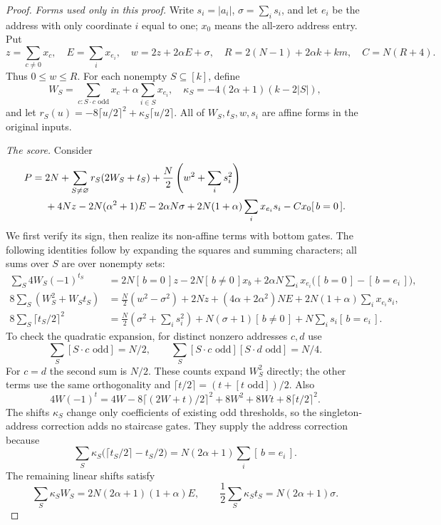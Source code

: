 \documentclass[11pt]{article}
\newcommand{\ind}[1]{[\,#1\,]}
\begin{document}
\begin{proof}
\emph{Forms used only in this proof.}
Write $s_i=|a_i|$, $\sigma=\sum_i s_i$, and let $e_i$ be the address with
only coordinate $i$ equal to one; $x_0$ means the all-zero address entry. Put
$$
z=\sum_{c\ne0}x_c,\quad E=\sum_i x_{e_i},\quad
w=2z+2\alpha E+\sigma,\quad R=2(N-1)+2\alpha k+km,\quad C=N(R+4).
$$
Thus $0\le w\le R$. For each nonempty $S\subseteq[k]$, define
$$
W_S=\sum_{c:S\cdot c\text{ odd}}x_c+\alpha\sum_{i\in S}x_{e_i},\quad
\kappa_S=-4(2\alpha+1)(k-2|S|),
$$
and let $r_S(u)=-8\lceil u/2\rceil^2+\kappa_S\lceil u/2\rceil$.
All of $W_S,t_S,w,s_i$ are affine forms in the original inputs.

\emph{The score.} Consider
\begin{align}\label{eq:bestscore}
P={}&2N+\sum_{S\ne\varnothing}r_S(2W_S+t_S)
 +\frac N2\left(w^2+\sum_i s_i^2\right)\notag\\
 &+4Nz-2N(\alpha^2+1)E-2\alpha N\sigma
 +2N(1+\alpha)\sum_i x_{e_i}s_i-Cx_0\ind{b=0}.
\end{align}
We first verify its sign, then realize its non-affine terms with bottom gates.
The following identities follow by expanding the squares and summing
characters; all sums over $S$ are over nonempty sets:
\begin{align*}
\sum_S4W_S(-1)^{t_S}
 &=2N\ind{b=0}z-2N\ind{b\ne0}x_b
   +2\alpha N\sum_i x_{e_i}\bigl(\ind{b=0}-\ind{b=e_i}\bigr),\\
8\sum_S(W_S^2+W_St_S)
 &=\frac N2(w^2-\sigma^2)+2Nz+(4\alpha+2\alpha^2)NE
   +2N(1+\alpha)\sum_i x_{e_i}s_i,\\
8\sum_S\lceil t_S/2\rceil^2
 &=\frac N2\left(\sigma^2+\sum_i s_i^2\right)
   +N(\sigma+1)\ind{b\ne0}+N\sum_i s_i\ind{b=e_i}.
\end{align*}
To check the quadratic expansion, for distinct nonzero addresses $c,d$ use
$$\sum_S[S\cdot c\text{ odd}]=N/2,\qquad
\sum_S[S\cdot c\text{ odd}][S\cdot d\text{ odd}]=N/4.$$
For $c=d$ the second sum is $N/2$. These counts expand $W_S^2$ directly;
the other terms use the same orthogonality and
$\lceil t/2\rceil=(t+[t\text{ odd}])/2$.
Also
$$
4W(-1)^t=4W-8\lceil(2W+t)/2\rceil^2+8W^2+8Wt+8\lceil t/2\rceil^2.
$$
The shifts $\kappa_S$ change only coefficients of existing odd thresholds,
so the singleton-address correction adds no staircase gates. They supply
the address correction because
$$
\sum_S\kappa_S\bigl(\lceil t_S/2\rceil-t_S/2\bigr)
 =N(2\alpha+1)\sum_i\ind{b=e_i}.
$$
The remaining linear shifts satisfy
$$\sum_S\kappa_SW_S=2N(2\alpha+1)(1+\alpha)E,\qquad
\frac12\sum_S\kappa_St_S=N(2\alpha+1)\sigma.$$

\end{proof}
\end{document}
